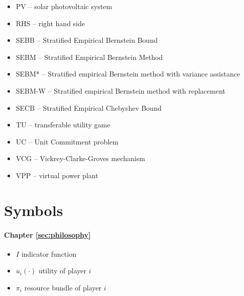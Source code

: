 \begin{itemize}
\item	PV -- solar photovoltaic system
\item	RHS -- right hand side
\item	SEBB -- Stratified Empirical Bernstein Bound
\item	SEBM -- Stratified Empirical Bernstein Method
\item	SEBM* -- Stratified empirical Bernstein method with variance assistance
\item	SEBM-W -- Stratified empirical Bernstein method with replacement
\item	SECB -- Stratified Empirical Chebyshev Bound
\item	TU -- transferable utility game
\item	UC -- Unit Commitment problem
\item	VCG -- Vickrey-Clarke-Groves mechanism
\item	VPP -- virtual power plant
\end{itemize}

\section*{Symbols}

\paragraph*{Chapter \ref{sec:philosophy}}
\begin{itemize}
\item	$I$ indicator function
\item	$u_i(\cdot)$ utility of player $i$
\item	$\pi_i$ resource bundle of player $i$
\end{itemize}


